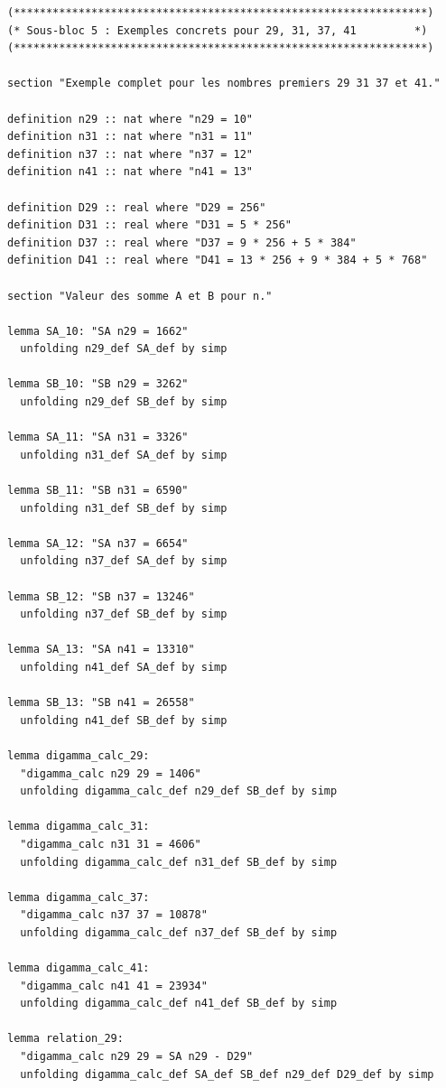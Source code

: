 \documentclass[a4paper,11pt]{article}
\begin{document}
\begin{holcode}[title={\textcolor{white}{Fichier : methode\_spectral.thy -- Partie 2/4}}]
\begin{lstlisting}
(****************************************************************)
(* Sous-bloc 5 : Exemples concrets pour 29, 31, 37, 41         *)
(****************************************************************)

section "Exemple complet pour les nombres premiers 29 31 37 et 41."

definition n29 :: nat where "n29 = 10"
definition n31 :: nat where "n31 = 11"
definition n37 :: nat where "n37 = 12"
definition n41 :: nat where "n41 = 13"

definition D29 :: real where "D29 = 256"
definition D31 :: real where "D31 = 5 * 256"
definition D37 :: real where "D37 = 9 * 256 + 5 * 384"
definition D41 :: real where "D41 = 13 * 256 + 9 * 384 + 5 * 768"

section "Valeur des somme A et B pour n."

lemma SA_10: "SA n29 = 1662"
  unfolding n29_def SA_def by simp

lemma SB_10: "SB n29 = 3262"
  unfolding n29_def SB_def by simp

lemma SA_11: "SA n31 = 3326"
  unfolding n31_def SA_def by simp

lemma SB_11: "SB n31 = 6590"
  unfolding n31_def SB_def by simp

lemma SA_12: "SA n37 = 6654"
  unfolding n37_def SA_def by simp

lemma SB_12: "SB n37 = 13246"
  unfolding n37_def SB_def by simp

lemma SA_13: "SA n41 = 13310"
  unfolding n41_def SA_def by simp

lemma SB_13: "SB n41 = 26558"
  unfolding n41_def SB_def by simp

lemma digamma_calc_29:
  "digamma_calc n29 29 = 1406"
  unfolding digamma_calc_def n29_def SB_def by simp

lemma digamma_calc_31:
  "digamma_calc n31 31 = 4606"
  unfolding digamma_calc_def n31_def SB_def by simp

lemma digamma_calc_37:
  "digamma_calc n37 37 = 10878"
  unfolding digamma_calc_def n37_def SB_def by simp

lemma digamma_calc_41:
  "digamma_calc n41 41 = 23934"
  unfolding digamma_calc_def n41_def SB_def by simp

lemma relation_29:
  "digamma_calc n29 29 = SA n29 - D29"
  unfolding digamma_calc_def SA_def SB_def n29_def D29_def by simp


\end{lstlisting}
\end{holcode}
\end{document}
